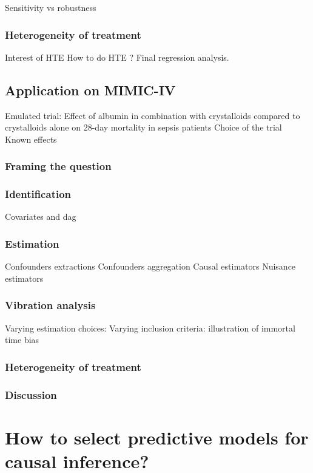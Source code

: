 \documentclass{report}
\begin{document}
Sensitivity vs robustness

\subsection{Heterogeneity of treatment}
Interest of HTE
How to do HTE ? Final regression analysis.

\section{Application on MIMIC-IV}\label{sec:causal_tuto:application}

Emulated trial: Effect of albumin in combination with crystalloids compared to crystalloids alone on 28-day mortality in sepsis patients
Choice of the trial
Known effects

\subsection{Framing the question}\label{subsec:causal_tuto:framing_mimic}
\subsection{Identification}
Covariates and dag
\subsection{Estimation}
Confounders extractions
Confounders aggregation
Causal estimators
Nuisance estimators
\subsection{Vibration analysis}
Varying estimation choices:
Varying inclusion criteria: illustration of immortal time bias
\subsection{Heterogeneity of treatment}

\subsection{Discussion}\label{subsec:causal_tuto:discussion}

\chapter{How to select predictive models for causal inference?}\label{chapter:causal_model_selection}
\end{document}
